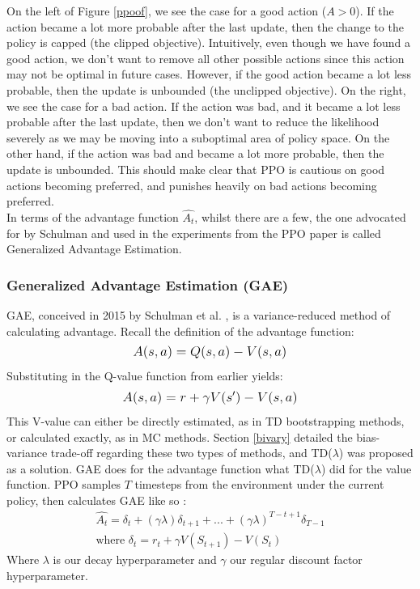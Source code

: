 \documentclass[12pt]{article}
\begin{document}
On the left of Figure \ref{ppoof}, we see the case for a good action ($A>0$). If the action became a lot more probable after the last update, then the change to the policy is capped (the clipped objective). Intuitively, even though we have found a good action, we don't want to remove all other possible actions since this action may not be optimal in future cases. However, if the good action became a lot less probable, then the update is unbounded (the unclipped objective). On the right, we see the case for a bad action. If the action was bad, and it became a lot less probable after the last update, then we don't want to reduce the likelihood severely as we may be moving into a suboptimal area of policy space. On the other hand, if the action was bad and became a lot more probable, then the update is unbounded. This should make clear that PPO is cautious on good actions becoming preferred, and punishes heavily on bad actions becoming preferred. \\\newline
In terms of the advantage function $\hat{A_t}$, whilst there are a few, the one advocated for by Schulman and used in the experiments from the PPO paper is called Generalized Advantage Estimation. 
\subsubsection{Generalized Advantage Estimation (GAE)}
GAE, conceived in 2015 by Schulman et al. \autocite{schulman2015high}, is a variance-reduced method of calculating advantage. Recall the definition of the advantage function: 
\begin{equation}
    \mathlarger{
        A(s,a) = Q(s,a) - V(s,a)
    }
\end{equation}
Substituting in the Q-value function from earlier yields:
\begin{equation}
    \mathlarger{
        A(s,a) = r + \gamma V(s') - V(s,a)
    }
\end{equation}
This V-value can either be directly estimated, as in TD bootstrapping methods, or calculated exactly, as in MC methods. Section \ref{bivary} detailed the bias-variance trade-off regarding these two types of methods, and TD($\lambda$) was proposed as a solution. GAE does for the advantage function what TD($\lambda$) did for the value function. 
PPO samples $T$ timesteps from the environment under the current policy, then calculates GAE like so \autocite{schulman2017proximal}:
\begin{equation}
    \begin{gathered}
        \hat{A_t} = \delta_t + (\gamma\lambda)\delta_{t+1} + ... + (\gamma\lambda)^{T-t+1}\delta_{T-1} \\
        \text{where } \delta_t = r_t + \gamma V(S_{t+1}) - V(S_t)
    \end{gathered}
\end{equation}
Where $\lambda$ is our decay hyperparameter and $\gamma$ our regular discount factor hyperparameter.
\end{document}
